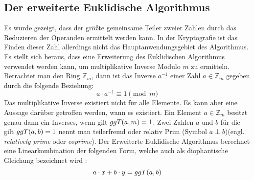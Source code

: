 \subsection{Der erweiterte Euklidische Algorithmus}
Es wurde gezeigt, dass der größte gemeinsame Teiler zweier Zahlen durch
das Reduzieren der Operanden ermittelt werden kann. In der Kryptografie ist
das Finden dieser Zahl allerdings nicht das Hauptanwendungsgebiet des
Algorithmus. Es stellt sich heraus, dass eine Erweiterung des Euklidischen Algorithmus
verwendet werden kann, um multiplikative Inverse Modulo $m$ zu ermitteln.
Betrachtet man den Ring $\mathbb{Z}_m$, dann ist das Inverse $a^{-1}$
einer Zahl $a \in \mathbb{Z}_m$ gegeben durch die folgende Beziehung:
\begin{equation}
  \label{eq:inverse}
  a \cdot a^{-1} \equiv 1 \pmod{m}
\end{equation}
Das multiplikative Inverse existiert nicht für alle Elemente. Es kann aber eine Aussage
darüber getroffen werden, wann es existiert. Ein Element
$a \in \mathbb{Z}_m$ besitzt genau dann ein Inverses, wenn gilt $ggT(a,m) = 1$.
Zwei Zahlen $a$ und $b$ für die gilt $ggT(a,b) = 1$ nennt man teilerfremd oder
relativ Prim (Symbol $a \perp b$)(engl. \textit{relatively prime} oder \textit{coprime}).
Der Erweiterte Euklidische Algorithmus berechnet eine Linearkombination der folgenden Form,
welche auch als diophantische Gleichung
bezeichnet wird \parencite[160]{BOOK:crypto} \parencite{SITE:diophant}:
\begin{equation*}
  a \cdot x + b \cdot y = ggT(a,b)
\end{equation*}

